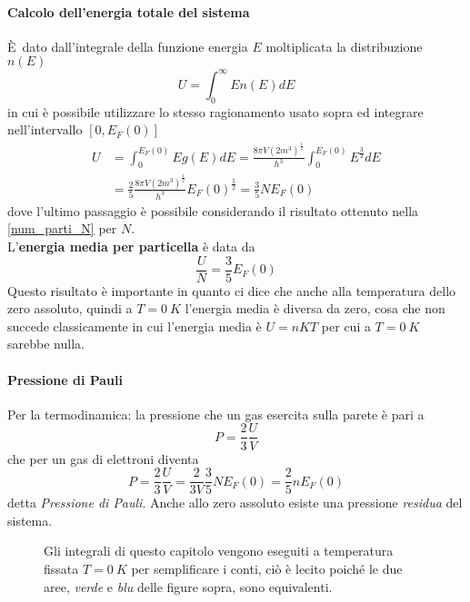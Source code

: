 \paragraph{Calcolo dell'energia totale del sistema}
È dato dall'integrale della funzione energia $E$ moltiplicata la distribuzione $n(E)$
\begin{equation}
U = \int_0^{\infty} E n(E) dE
\end{equation}
in cui è possibile utilizzare lo stesso ragionamento usato sopra ed integrare nell'intervallo $[0,E_F(0)]$
\begin{equation}
\begin{split}
U & = \int_0^{E_F(0)} E g(E) dE = \frac{8\pi V (2m^3)^{ \frac{1}{2} }}{h^3} \int_0^{E_F(0)} E^{ \frac{3}{2} } dE \\
& = \frac{2}{5} \frac{8\pi V (2m^3)^{ \frac{1}{2} }}{h^3} E_F(0)^{ \frac{5}{2} } = \frac{3}{5} N E_F(0)
\end{split}
\end{equation}
dove l'ultimo passaggio è possibile considerando il risultato ottenuto nella \ref{num_parti_N} per $N$. \\
L'\textbf{energia media per particella} è data da
\begin{equation}
\frac{U}{N} = \frac{3}{5} E_F(0)
\end{equation}
Questo risultato è importante in quanto ci dice che anche alla temperatura dello zero assoluto, quindi a $T = \SI{0}{K}$ l'energia media è diversa da zero, cosa che non succede classicamente in cui l'energia media è $U = n K T$ per cui a $T=\SI{0}{K}$ sarebbe nulla.

\paragraph{Pressione di Pauli} Per la termodinamica: la pressione che un gas esercita sulla parete è pari a
\begin{equation}
P = \frac{2}{3} \frac{U}{V}
\end{equation}
che per un gas di elettroni diventa
\begin{equation}
P = \frac{2}{3} \frac{U}{V} = \frac{2}{3V} \frac{3}{5} N E_F(0) = \frac{2}{5} n E_F(0) 
\end{equation}
detta \textit{Pressione di Pauli}.
Anche allo zero assoluto esiste una pressione \textit{residua} del sistema.

\begin{figure}[h]
    \centering
    \caption{Gli integrali di questo capitolo vengono eseguiti a temperatura fissata $T=\SI{0}{K}$ per semplificare i conti, ciò è lecito poiché le due aree, \textit{verde} e \textit{blu} delle figure sopra, sono equivalenti.}
    \label{fig_integrali}
\end{figure}



